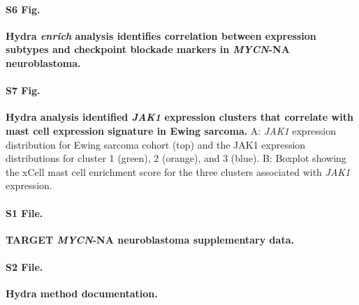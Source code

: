 \documentclass[10pt,letterpaper]{article}
\begin{document}
\paragraph*{S6 Fig.}
\label{S6_Fig} {\bf Hydra \textit{enrich} analysis identifies correlation between expression subtypes and checkpoint blockade markers in \textit{MYCN}-NA neuroblastoma.}

\paragraph*{S7 Fig.}
\label{S7_Fig} {\bf Hydra analysis identified \textit{JAK1} expression clusters that correlate with mast cell expression signature in Ewing sarcoma.} A: \textit{JAK1} expression distribution for Ewing sarcoma cohort (top) and the JAK1 expression distributions for cluster 1 (green), 2 (orange), and 3 (blue). B: Boxplot showing the xCell mast cell enrichment score for the three clusters associated with \textit{JAK1} expression.

\paragraph*{S1 File.}
\label{S1_File}
{\bf TARGET \textit{MYCN}-NA neuroblastoma supplementary data.}

\paragraph*{S2 File.}
\label{S2_File}
{\bf Hydra method documentation.}


\end{document}
